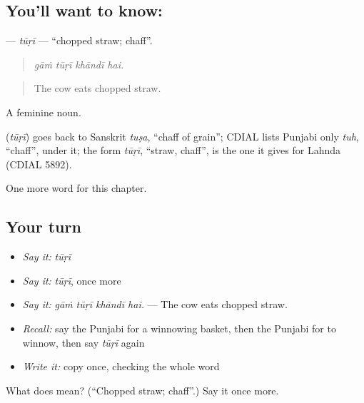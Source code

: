 \subsection*{You'll want to know: }
\textbf{} — \emph{tūṛī} — \textquotedblleft{}chopped straw; chaff\textquotedblright{}.

\begin{quote}
   
\end{quote}

\begin{quote}
\emph{gāṁ tūṛī khāndī hai.}
\end{quote}

\begin{quote}
The cow eats chopped straw.
\end{quote}

A feminine noun.

\begin{cousinweb}
\textbf{} (\emph{tūṛī}) goes back to Sanskrit \emph{tuṣa}, \textquotedblleft{}chaff of grain\textquotedblright{}; CDIAL lists Punjabi only \emph{tuh}, \textquotedblleft{}chaff\textquotedblright{}, under it; the form \emph{tūṛī}, \textquotedblleft{}straw, chaff\textquotedblright{}, is the one it gives for Lahnda (CDIAL 5892).
\end{cousinweb}

\begin{grammarlens}[title={What you've built}]
One more word for this chapter.
\end{grammarlens}

\subsection*{Your turn}
\begin{itemize}
\raggedright
  \item \emph{Say it:} \emph{tūṛī}
  \item \emph{Say it:} \emph{tūṛī}, once more
  \item \emph{Say it:} \emph{gāṁ tūṛī khāndī hai.} — The cow eats chopped straw.
  \item \emph{Recall:} say the Punjabi for a winnowing basket, then the Punjabi for to winnow, then say \emph{tūṛī} again
  \item \emph{Write it:} copy \textbf{} once, checking the whole word
\end{itemize}

\begin{tcolorbox}[breakable,colback=teal!4,colframe=teal!35!black,title={Before you move on}]
What does  mean? (\textquotedblleft{}Chopped straw; chaff\textquotedblright{}.) Say it once more.
\end{tcolorbox}
